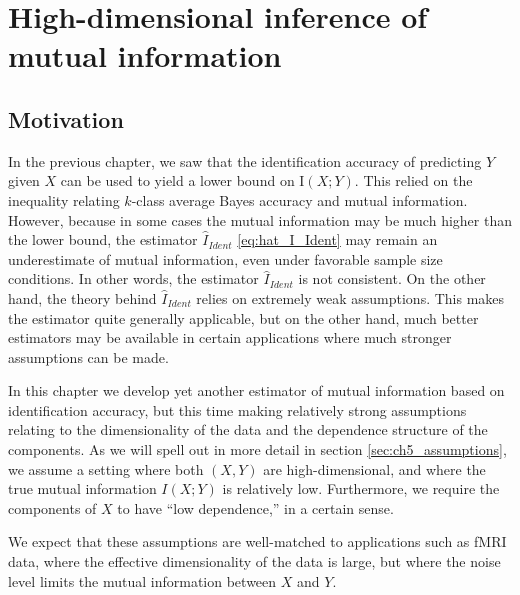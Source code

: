 
\chapter{High-dimensional inference of mutual information} %

\label{Chapter5} %

\section{Motivation}

In the previous chapter, we saw that the identification accuracy of
predicting $Y$ given $X$ can be used to yield a lower bound on
$\text{I}(X; Y)$.  This relied on the inequality relating $k$-class
average Bayes accuracy and mutual information.  However, because in
some cases the mutual information may be much higher than the lower
bound, the estimator $\hat{I}_{Ident}$ \eqref{eq:hat_I_Ident} may remain an underestimate of
mutual information, even under favorable sample size conditions.  In
other words, the estimator $\hat{I}_{Ident}$ is not consistent.  On the
other hand, the theory behind $\hat{I}_{Ident}$ relies on extremely weak
assumptions.  This makes the estimator quite generally applicable, but
on the other hand, much better estimators may be available in certain
applications where much stronger assumptions can be made.

In this chapter we develop yet another estimator of mutual information
based on identification accuracy, but this time making relatively strong
assumptions relating to the dimensionality of the data and the
dependence structure of the components.  As we will spell out in more
detail in section \ref{sec:ch5_assumptions}, we assume a setting where both
$(X, Y)$ are high-dimensional, and where the true mutual information
$I(X; Y)$ is relatively low.  Furthermore, we require the components
of $X$ to have ``low dependence,'' in a certain sense.

We expect that these assumptions are well-matched to applications such
as fMRI data, where the effective dimensionality of the data is large,
but where the noise level limits the mutual information between $X$
and $Y$.


